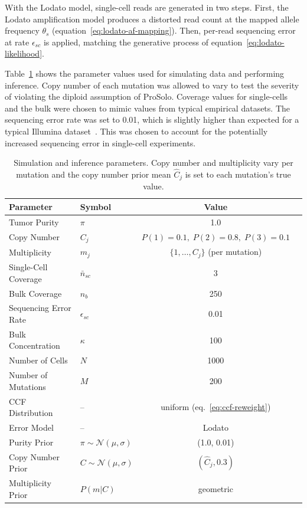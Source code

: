 \documentclass[10pt]{article}
\begin{document}
With the Lodato model, single-cell reads are generated in two steps.
First, the Lodato amplification model produces a distorted read count at the mapped allele frequency $\theta_s$ (equation~\eqref{eq:lodato-af-mapping}).
Then, per-read sequencing error at rate $\epsilon_{sc}$ is applied, matching the generative process of equation~\eqref{eq:lodato-likelihood}.

Table~\ref{tab:simulation-parameters} shows the parameter values used for simulating data and performing inference.
Copy number of each mutation was allowed to vary to test the severity of violating the diploid assumption of ProSolo.
Coverage values for single-cells and the bulk were chosen to mimic values from typical empirical datasets.
The sequencing error rate was set to 0.01, which is slightly higher than expected for a typical Illumina dataset~\cite{Stoler2021}.
This was chosen to account for the potentially increased sequencing error in single-cell experiments.

\begin{table}[htbp]
\centering
\begin{tabular}{llcl}
\hline
\textbf{Parameter} & \textbf{Symbol} & \textbf{Value} \\
\hline
Tumor Purity & $\pi$ & 1.0 \\
Copy Number & $C_j$ & $P(1){=}0.1,\; P(2){=}0.8,\; P(3){=}0.1$ \\
Multiplicity & $m_j$ & $\{1, \ldots, C_j\}$ (per mutation) \\
Single-Cell Coverage & $\bar{n}_{sc}$ & 3 \\
Bulk Coverage & $n_b$ & 250 \\
Sequencing Error Rate & $\epsilon_{sc}$ & 0.01 \\
Bulk Concentration & $\kappa$ & 100 \\
Number of Cells & $N$ & 1000 \\
Number of Mutations & $M$ & 200 \\
CCF Distribution & -- & uniform (eq.~\eqref{eq:ccf-reweight}) \\
Error Model & -- & Lodato \\
Purity Prior & $\pi \sim \mathcal{N}(\mu, \sigma)$ & (1.0, 0.01) \\
Copy Number Prior & $C \sim \mathcal{N}(\mu, \sigma)$ & $(\hat{C}_j, 0.3)$ \\
Multiplicity Prior & $P(m|C)$ & geometric \\
\hline
\end{tabular}
\caption{Simulation and inference parameters.
Copy number and multiplicity vary per mutation and the copy number prior mean $\hat{C}_j$ is set to each mutation's true value.}
\label{tab:simulation-parameters}
\end{table}
\end{document}
